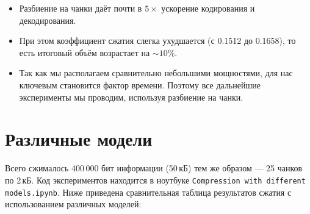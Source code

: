 \documentclass[a4paper,11pt]{article}
\begin{document}
\begin{table}[ht]
\centering
{}
\caption{Сравнение без чанков и с чанками}
\end{table}

\begin{itemize}
  \item Разбиение на чанки даёт почти в $5\times$ ускорение кодирования и декодирования.
  \item При этом коэффициент сжатия слегка ухудшается (с 0.1512 до 0.1658), то есть итоговый объём возрастает на $\sim10\%$.
  \item Так как мы располагаем сравнительно небольшими мощностями, для нас ключевым становится фактор времени. Поэтому все дальнейшие эксперименты мы проводим, используя разбиение на чанки.
\end{itemize}

\section*{Различные модели}

Всего сжималось 400\,000 бит информации (50\,кБ) тем же образом — 25 чанков по 2\,кБ.
Код экспериментов находится в ноутбуке \texttt{Compression with different models.ipynb}.
Ниже приведена сравнительная таблица результатов сжатия с использованием различных моделей:
\end{document}
